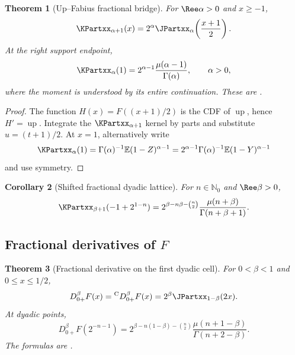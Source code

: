 \documentclass[11pt,oneside]{article}
\newtheorem{theorem}{Theorem}[section]
\newtheorem{corollary}[theorem]{Corollary}
\theoremstyle{definition}
\theoremstyle{remark}
\newcommand{\Up}{\operatorname{up}}
\newcommand{\E}{\mathbb E}
\newcommand{\N}{\mathbb N}
\newcommand{\1}{\mathbf 1}
\begin{document}
\begin{theorem}[Up--Fabius fractional bridge]
\label{p7:thm:up-fractional-bridge}
For $\Ree\alpha>0$ and $x\ge-1$,
\begin{equation}
 \KPartxx_{\alpha+1}(x)
 =2^\alpha\JPartxx_\alpha\!\left(\frac{x+1}{2}\right).
 \label{p7:eq:up-fractional-bridge}
\end{equation}
At the right support endpoint,
\begin{equation}
 \KPartxx_\alpha(1)
 =2^{\alpha-1}\frac{\mu(\alpha-1)}{\Gamma(\alpha)},
 \qquad \alpha>0,
 \label{p7:eq:up-fractional-endpoint}
\end{equation}
where the moment is understood by its entire continuation.  These are \statusproved.
\end{theorem}

\begin{proof}
The function $H(x)=F((x+1)/2)$ is the CDF of $\Up$, hence $H'=\Up$.  Integrate the
$\KPartxx_{\alpha+1}$ kernel by parts and substitute $u=(t+1)/2$.  At $x=1$, alternatively write
\[
 \KPartxx_\alpha(1)=\Gamma(\alpha)^{-1}\E(1-Z)^{\alpha-1}
 =2^{\alpha-1}\Gamma(\alpha)^{-1}\E(1-Y)^{\alpha-1}
\]
and use symmetry.
\end{proof}

\begin{corollary}[Shifted fractional dyadic lattice]
For $n\in\N_0$ and $\Ree\beta>0$,
\begin{equation}
 \KPartxx_{\beta+1}(-1+2^{1-n})
 =2^{\beta-n\beta-\binom n2}
 \frac{\mu(n+\beta)}{\Gamma(n+\beta+1)}.
 \label{p7:eq:up-fractional-lattice}
\end{equation}
\end{corollary}

\subsection{Fractional derivatives of $F$}

\begin{theorem}[Fractional derivative on the first dyadic cell]
\label{p7:thm:F-fractional-derivative}
For $0<\beta<1$ and $0\le x\le1/2$,
\begin{equation}
 D_{0+}^{\beta}F(x)
 ={}^{\mathrm C}D_{0+}^{\beta}F(x)
 =2^\beta\JPartxx_{1-\beta}(2x).
 \label{p7:eq:F-fractional-derivative}
\end{equation}
At dyadic points,
\begin{equation}
 D_{0+}^{\beta}F(2^{-n-1})
 =2^{\beta-n(1-\beta)-\binom n2}
 \frac{\mu(n+1-\beta)}{\Gamma(n+2-\beta)}.
 \label{p7:eq:F-fractional-derivative-dyadic}
\end{equation}
The formulas are \statusproved.
\end{theorem}
\end{document}

